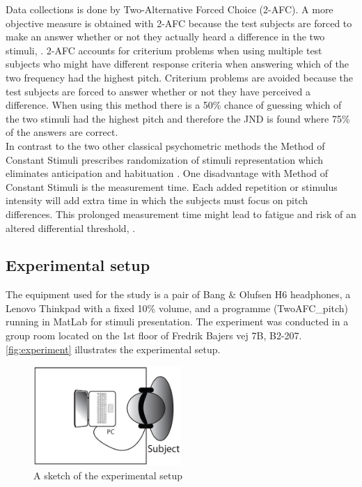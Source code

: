 Data collections is done by Two-Alternative Forced Choice (2-AFC). A more objective measure is obtained with 2-AFC because the test subjects are forced to make an answer whether or not they actually heard a difference in the two stimuli, \citep[p. 1219]{Ehrenstein1999}. 2-AFC accounts for criterium problems when using multiple test subjects who might have different response criteria when answering which of the two frequency had the highest pitch. Criterium problems are avoided because the test subjects are forced to answer whether or not they have perceived a difference. When using this method there is a 50\% chance of guessing which of the two stimuli had the highest pitch and therefore the JND is found where 75\% of the answers are correct.\\[5mm]
%
In contrast to the two other classical psychometric methods the Method of Constant Stimuli prescribes randomization of stimuli representation which eliminates anticipation and habituation \citep[p. 15]{Poulsen2005}. One disadvantage with Method of Constant Stimuli is the measurement time. Each added repetition or stimulus intensity will add extra time in which the subjects must focus on pitch differences. This prolonged measurement time might lead to fatigue and risk of an altered differential threshold, \citep[p. 16]{Poulsen2005}. 
%

\subsection*{Experimental setup}
%
The equipment used for the study is a pair of Bang $\&$ Olufsen H6 headphones, a Lenovo Thinkpad with a fixed 10\% volume, and a programme (TwoAFC\_pitch) running in MatLab for stimuli presentation. The experiment was conducted in a group room located on the 1st floor of Fredrik Bajers vej 7B, B2-207. \autoref{fig:experiment} illustrates the experimental setup.
%
\begin{figure}[H]
\centering
\includegraphics[width = 0.5\textwidth]{Figure/Vores_Figurer/experiment.png} 
\caption{A sketch of the experimental setup}
\label{fig:experiment}
\end{figure}
%

